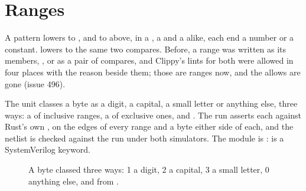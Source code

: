\section{Ranges}
\label{sec:x-range}

A pattern  lowers to , and
 to  above, in a , a
 and a  alike, each end a number or a
constant.  lowers to the same two
compares. Before, a range was written as its members,
, or as a pair of compares, and Clippy's lints
for both were allowed in four places with the reason beside them;
those are ranges now, and the allows are gone (issue 496).

The unit classes a byte as a digit, a capital, a small letter or
anything else, three ways: a  of inclusive ranges, a
 of exclusive ones, and . The run asserts
each against Rust's own , on the edges of every
range and a byte either side of each, and the netlist is checked
against the run under both simulators. The module is
:  is a SystemVerilog keyword.

\begin{figure}[htbp]
\centering

\caption{A byte classed three ways: 1 a digit, 2 a capital, 3 a small
letter, 0 anything else, and  from .}
\label{fig:x-range}
\end{figure}




